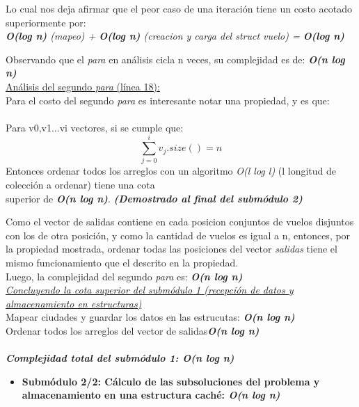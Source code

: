 \noindent Lo cual nos deja afirmar que el peor caso de una iteración tiene un costo acotado superiormente por:\\
\indent	\textit{\textbf{O(log n)} (mapeo) + \textbf{O(log n)} (creacion y carga del struct vuelo) = \textbf{O(log n)}}

\noindent Observando que el \textit{para} en análisis cicla n veces, su complejidad es de: \textit{\textbf{O(n log n)}}\\

\underline{Análisis del segundo \textit{para} (línea 18):}\\
\noindent Para el costo del segundo \textit{para} es interesante notar una propiedad, y es que:\\ \\
\indent Para v0,v1...vi vectores, si se cumple que:
\[
\sum_{j=0}^{i}v_{j}.size() = n 
\]
\indent Entonces ordenar todos los arreglos con un algoritmo \textit{O(l log l)} (l longitud de colección a ordenar) tiene una cota\\ \indent superior de \textit{\textbf{O(n log n)}}. \textit{\textbf{(Demostrado al final del submódulo 2)}}

\noindent Como el vector de salidas contiene en cada posicion conjuntos de vuelos disjuntos con los de otra posición, y como la cantidad de vuelos es igual a n, entonces, por la propiedad mostrada, ordenar todas las posiciones del vector \textit{salidas} tiene el mismo funcionamiento que el descrito en la propiedad.\\
Luego, la complejidad del segundo \textit{para} es: \textbf{\textit{O(n log n)}}\\

\noindent \underline{\textit{Concluyendo la cota superior del submódulo 1 (recepción de datos y almacenamiento en estructuras)}}\\
\indent Mapear ciudades y guardar los datos en las estrucutas: \textbf{\textit{O(n log n)}}\\
\indent Ordenar todos los arreglos del vector de salidas\hspace{36 px}\textbf{\textit{O(n log n)}}\\ \\
\textbf{\textit{Complejidad total del submódulo 1: O(n log n)}}

\newpage
\begin{itemize}
\item \textbf{Submódulo 2/2: Cálculo de las subsoluciones del problema y almacenamiento en una estructura caché: \textit{O(n log n)}}\\
\end{itemize}


